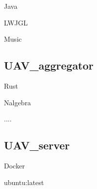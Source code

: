 \documentclass[15pt]{sprawozdanie}
\begin{document}
Java

LWJGL

Music

\subsection{UAV\_aggregator}

Rust

Nalgebra

....


\subsection{UAV\_server}

Docker

ubuntu:latest
\end{document}
